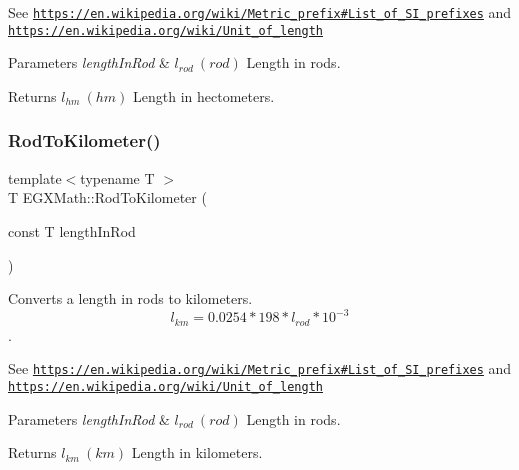 See \href{https://en.wikipedia.org/wiki/Metric_prefix#List_of_SI_prefixes}{\tt https\+://en.\+wikipedia.\+org/wiki/\+Metric\+\_\+prefix\#\+List\+\_\+of\+\_\+\+S\+I\+\_\+prefixes} and \href{https://en.wikipedia.org/wiki/Unit_of_length}{\tt https\+://en.\+wikipedia.\+org/wiki/\+Unit\+\_\+of\+\_\+length} 
\begin{DoxyParams}{Parameters}
{\em length\+In\+Rod} & $ l_{rod}\ (rod)$ Length in rods. \\
\hline
\end{DoxyParams}
\begin{DoxyReturn}{Returns}
$ l_{hm}\ (hm)$ Length in hectometers. 
\end{DoxyReturn}
\mbox{\label{group___e_g_x_math-_conversions-_length_conversions-_surveyors-_rod-_s_i_ga074418cb0c673bef5eed361a610866a0}} 
\subsubsection{\texorpdfstring{Rod\+To\+Kilometer()}{RodToKilometer()}}
{\footnotesize\ttfamily template$<$typename T $>$ \\
T E\+G\+X\+Math\+::\+Rod\+To\+Kilometer (\begin{DoxyParamCaption}\item[{const T}]{length\+In\+Rod }\end{DoxyParamCaption})}



Converts a length in rods to kilometers. \[ l_{km}=0.0254 * 198 * l_{rod} * 10^{-3} \]. 

See \href{https://en.wikipedia.org/wiki/Metric_prefix#List_of_SI_prefixes}{\tt https\+://en.\+wikipedia.\+org/wiki/\+Metric\+\_\+prefix\#\+List\+\_\+of\+\_\+\+S\+I\+\_\+prefixes} and \href{https://en.wikipedia.org/wiki/Unit_of_length}{\tt https\+://en.\+wikipedia.\+org/wiki/\+Unit\+\_\+of\+\_\+length} 
\begin{DoxyParams}{Parameters}
{\em length\+In\+Rod} & $ l_{rod}\ (rod)$ Length in rods. \\
\hline
\end{DoxyParams}
\begin{DoxyReturn}{Returns}
$ l_{km}\ (km)$ Length in kilometers. 
\end{DoxyReturn}
\mbox{\label{group___e_g_x_math-_conversions-_length_conversions-_surveyors-_rod-_s_i_ga9d9fb3fa0628bdf3b9fb60f719f8010e}} 
